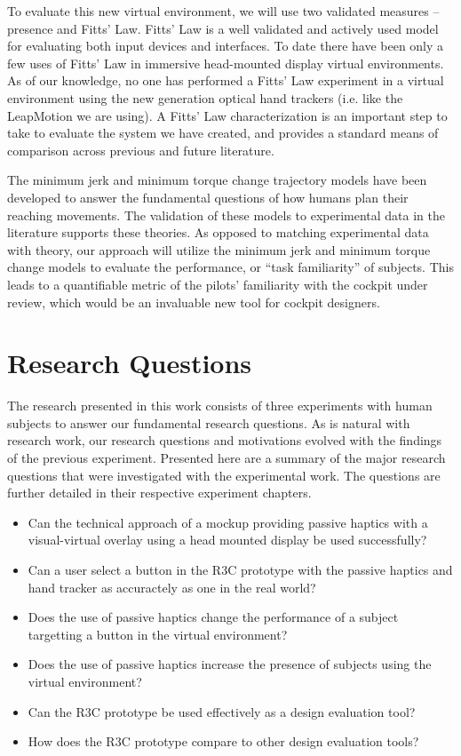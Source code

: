 To evaluate this new virtual environment, we will use two validated measures -- presence and Fitts' Law.
Fitts' Law is a well validated and actively used model for evaluating both input devices and interfaces.
To date there have been only a few uses of Fitts' Law in immersive head-mounted display virtual environments.
As of our knowledge, no one has performed a Fitts' Law experiment in a virtual environment using the new generation optical hand trackers (i.e.
like the LeapMotion we are using).
A Fitts' Law characterization is an important step to take to evaluate the system we have created, and provides a standard means of comparison across previous and future literature.

The minimum jerk and minimum torque change trajectory models have been developed to answer the fundamental questions of how humans plan their reaching movements.
The validation of these models to experimental data in the literature supports these theories.
As opposed to matching experimental data with theory, our approach will utilize the minimum jerk and minimum torque change models to evaluate the performance, or ``task familiarity'' of subjects.
This leads to a quantifiable metric of the pilots' familiarity with the cockpit under review, which would be an invaluable new tool for cockpit designers.

\section{Research Questions}
\label{hypotheses}

The research presented in this work consists of three experiments with human subjects to answer our fundamental research questions.
As is natural with research work, our research questions and motivations evolved with the findings of the previous experiment.
Presented here are a summary of the major research questions that were investigated with the experimental work.
The questions are further detailed in their respective experiment chapters.

\begin{itemize}
    \item Can the technical approach of a mockup providing passive haptics with a visual-virtual overlay using a head mounted display be used successfully?
    \item Can a user select a button in the R3C prototype with the passive haptics and hand tracker as accuractely as one in the real world?
    \item Does the use of passive haptics change the performance of a subject targetting a button in the virtual environment?
    \item Does the use of passive haptics increase the presence of subjects using the virtual environment?
    \item Can the R3C prototype be used effectively as a design evaluation tool?
    \item How does the R3C prototype compare to other design evaluation tools?
\end{itemize}



